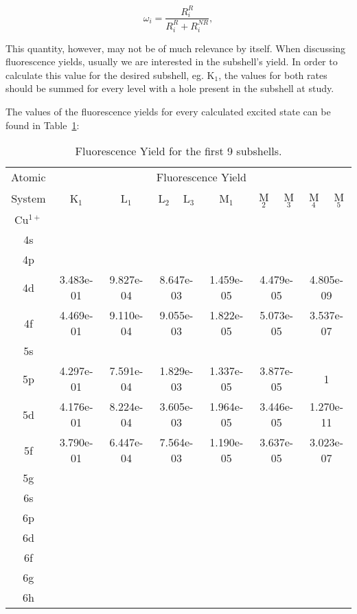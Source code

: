 \begin{equation}
    \omega_i=\frac{R_i^{R}}{R_i^{R}+R_i^{NR}},
\end{equation}

This quantity, however, may not be of much relevance by itself. When discussing fluorescence yields, usually we are interested in the subshell's yield. In order to calculate this value for the desired subshell, eg. K$_1$, the values for both rates should be summed for every level with a hole present in the subshell at study.

The values of the fluorescence yields for every calculated excited state can be found in Table~\ref{tab:FY}:

\begin{table}[h!]
    \centering
    \caption{Fluorescence Yield for the first 9 subshells.}
    \label{tab:FY}
    \begin{tabular}{c||c|c|c|c|c|c|c|c|c}
        \toprule Atomic&\multicolumn{9}{c}{Fluorescence Yield}\\
        System&K$_1$&L$_1$&L$_2$&L$_3$&M$_1$&M$_2$&M$_3$&M$_4$&M$_5$\\
        \midrule
        Cu$^{1+}$ \\ 
        4s&  \\
        4p &  &\\
        4d &3.483e-01 &9.827e-04&\multicolumn{2}{c|}{8.647e-03}&1.459e-05&\multicolumn{2}{c|}{4.479e-05}&\multicolumn{2}{c}{4.805e-09}\\
        4f &4.469e-01&9.110e-04&\multicolumn{2}{c|}{9.055e-03}&1.822e-05&\multicolumn{2}{c|}{5.073e-05}&\multicolumn{2}{c}{3.537e-07} \\
        5s & \\
        5p &4.297e-01&7.591e-04&\multicolumn{2}{c|}{1.829e-03}&1.337e-05&\multicolumn{2}{c|}{3.877e-05}&\multicolumn{2}{c}{1} \\
        5d &4.176e-01&8.224e-04&\multicolumn{2}{c|}{3.605e-03}&1.964e-05&\multicolumn{2}{c|}{3.446e-05}&\multicolumn{2}{c}{1.270e-11} \\
        5f &3.790e-01&6.447e-04&\multicolumn{2}{c|}{7.564e-03}&1.190e-05&\multicolumn{2}{c|}{3.637e-05}&\multicolumn{2}{c}{3.023e-07} \\
        5g & \\
        6s & \\
        6p & \\
        6d & \\
        6f & \\
        6g & \\
        6h&\\
        \bottomrule
    \end{tabular}
\end{table}

